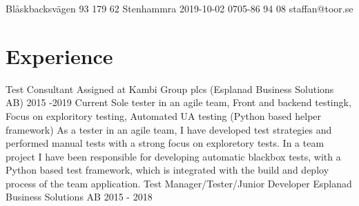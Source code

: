 \documentclass{sobCV}[2017/07/08]
\begin{document}
               {Blåskbacksvägen 93}
               {179 62 Stenhammra}
               {2019-10-02}
               {0705-86 94 08}
               {staffan@toor.se}


   \section{Experience}
      \experiencenode
      {Test Consultant}                %
      {Assigned at Kambi Group plcs (Esplanad Business Solutions AB)}%
      {2015 -2019}                        %
      {Current}{                           %
          Sole tester in an agile team,
          Front and backend testingk,
          Focus on exploritory testing,
          Automated UA testing (Python based helper framework)
      }{
          As a tester in an agile team, I have developed test strategies and 
          performed manual tests with a strong focus on exploretory tests. In a
          team project I have been responsible for developing automatic 
          blackbox tests, with a Python based test framework, which is 
          integrated with the build and deploy process of the team application.
      }
      \experiencenode
      {Test Manager/Tester/Junior Developer}         %
      {Esplanad Business Solutions AB}        %
      {2015 - 2018}                        %
\end{document}
